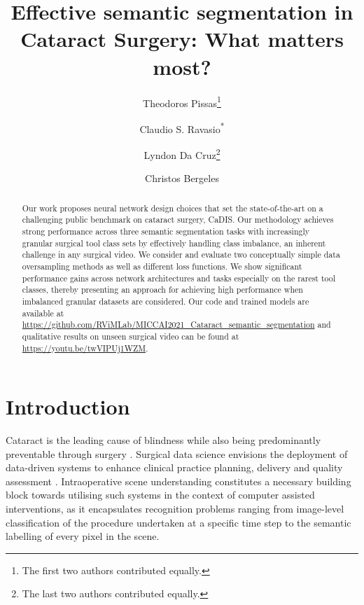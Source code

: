 \documentclass[runningheads]{llncs}
\begin{document}
\title{Effective semantic segmentation in Cataract Surgery: What matters most?}

\author{Theodoros Pissas\thanks{The first two authors contributed equally.} \and
Claudio S. Ravasio\textsuperscript{*} \and \authorcr
Lyndon Da Cruz\thanks{The last two authors contributed equally.} \and
Christos Bergeles\textsuperscript{}}




\maketitle              \begin{abstract}

Our work proposes neural network design choices that set the state-of-the-art on a challenging public benchmark on cataract surgery, CaDIS. Our methodology achieves strong performance across three semantic segmentation tasks with increasingly granular surgical tool class sets by effectively handling class imbalance, an inherent challenge in any surgical video. We consider and evaluate two conceptually simple data oversampling methods as well as different loss functions. We show significant performance gains across network architectures and tasks especially on the rarest tool classes, thereby presenting an approach for achieving high performance when imbalanced granular datasets are considered. Our code and trained models are available at \url{https://github.com/RViMLab/MICCAI2021_Cataract_semantic_segmentation} and qualitative results on unseen surgical video can be found at \url{https://youtu.be/twVIPUj1WZM}.
\end{abstract}

\section{Introduction}\label{intro}
Cataract is the leading cause of blindness \cite{WHO_blindness} while also being predominantly preventable through surgery \cite{wang2016cataract}. Surgical data science envisions the deployment of data-driven systems to enhance clinical practice planning, delivery and quality assessment \cite{SDSc2020}. Intraoperative scene understanding constitutes a necessary building block towards utilising such systems in the context of computer assisted interventions, as it encapsulates recognition problems ranging from image-level classification of the procedure undertaken at a specific time step to the semantic labelling of every pixel in the scene.
\end{document}
